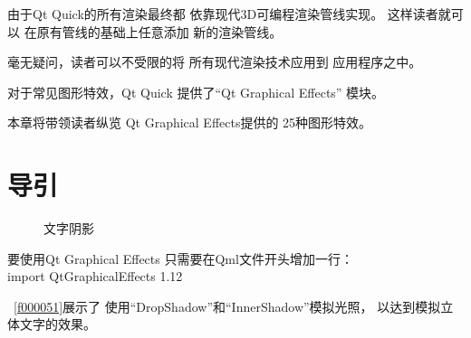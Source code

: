 ﻿





由于Qt Quick的所有渲染最终都
依靠现代3D可编程渲染管线实现。
这样读者就可以
在原有管线的基础上任意添加
新的渲染管线。

毫无疑问，读者可以不受限的将
所有现代渲染技术应用到
应用程序之中。

对于常见图形特效，Qt Quick
提供了“Qt Graphical Effects”
模块。

本章将带领读者纵览
Qt Graphical Effects提供的
25种图形特效。

\FloatBarrier
\section{
导引
}\label{c000015s000001}


\begin{figure}[htb] %
\marginnote{\setlength\fboxsep{2pt}\fbox{\footnotesize{\kaishu\figurename\,}\footnotesize{\ref{p000012}}}}\centering %
\setlength\fboxsep{-1pt} %
\caption{文字阴影} %
\label{p000012} %
\end{figure}


要使用Qt Graphical Effects
只需要在Qml文件开头增加一行：\\
import QtGraphicalEffects 1.12

\filesourcenumbernameone\ \ref{f000051}展示了
使用“DropShadow”和“InnerShadow”模拟光照，
以达到模拟立体文字的效果。

